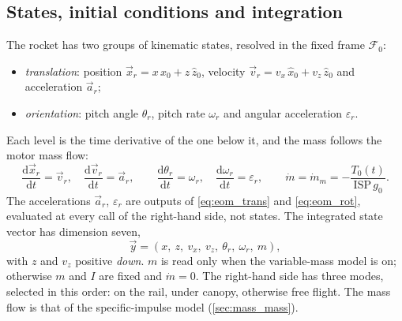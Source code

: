 \subsection{States, initial conditions and integration}\label{sec:states}
The rocket has two groups of kinematic states, resolved in the fixed frame $\mathcal{F}_0$:
\begin{itemize}
    \item \emph{translation}: position $\vec{x}_r=x\,\hat{x}_0+z\,\hat{z}_0$, velocity
    $\vec{v}_r=v_x\,\hat{x}_0+v_z\,\hat{z}_0$ and acceleration $\vec{a}_r$;
    \item \emph{orientation}: pitch angle $\theta_r$, pitch rate $\omega_r$ and angular acceleration
    $\varepsilon_r$.
\end{itemize}
Each level is the time derivative of the one below it, and the mass follows the motor mass flow:
\begin{equation} \label{eq:state_kinematics}
    \frac{\mathrm{d}\vec{x}_r}{\mathrm{d}t}=\vec{v}_r, \quad
    \frac{\mathrm{d}\vec{v}_r}{\mathrm{d}t}=\vec{a}_r, \qquad
    \frac{\mathrm{d}\theta_r}{\mathrm{d}t}=\omega_r, \quad
    \frac{\mathrm{d}\omega_r}{\mathrm{d}t}=\varepsilon_r, \qquad
    \dot m=\dot m_m=-\frac{T_0(t)}{\mathrm{ISP}\,g_0}.
\end{equation}
The accelerations $\vec{a}_r$, $\varepsilon_r$ are outputs of \autoref{eq:eom_trans} and
\autoref{eq:eom_rot}, evaluated at every call of the right-hand side, not states. The integrated
state vector has dimension seven,
\begin{equation} \label{eq:state_vector}
    \vec{y} = \left(x,\ z,\ v_x,\ v_z,\ \theta_r,\ \omega_r,\ m\right),
\end{equation}
with $z$ and $v_z$ positive \emph{down}. $m$ is read only when the variable-mass model is on;
otherwise $m$ and $I$ are fixed and $\dot m=0$. The right-hand side has three modes, selected in
this order: on the rail, under canopy, otherwise free flight.
The mass flow is that of the specific-impulse model (\autoref{sec:mass_mass}).

